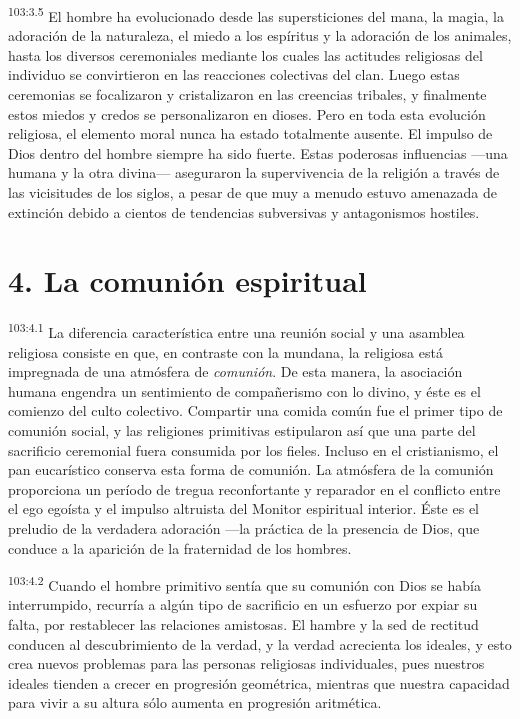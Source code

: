 \par
\textsuperscript{103:3.5} El hombre ha evolucionado desde las supersticiones del mana, la magia, la adoración de la naturaleza, el miedo a los espíritus y la adoración de los animales, hasta los diversos ceremoniales mediante los cuales las actitudes religiosas del individuo se convirtieron en las reacciones colectivas del clan. Luego estas ceremonias se focalizaron y cristalizaron en las creencias tribales, y finalmente estos miedos y credos se personalizaron en dioses. Pero en toda esta evolución religiosa, el elemento moral nunca ha estado totalmente ausente. El impulso de Dios dentro del hombre siempre ha sido fuerte. Estas poderosas influencias ---una humana y la otra divina--- aseguraron la supervivencia de la religión a través de las vicisitudes de los siglos, a pesar de que muy a menudo estuvo amenazada de extinción debido a cientos de tendencias subversivas y antagonismos hostiles.

\section*{4. La comunión espiritual}
\par
\textsuperscript{103:4.1} La diferencia característica entre una reunión social y una asamblea religiosa consiste en que, en contraste con la mundana, la religiosa está impregnada de una atmósfera de \textit{comunión}. De esta manera, la asociación humana engendra un sentimiento de compañerismo con lo divino, y éste es el comienzo del culto colectivo. Compartir una comida común fue el primer tipo de comunión social, y las religiones primitivas estipularon así que una parte del sacrificio ceremonial fuera consumida por los fieles. Incluso en el cristianismo, el pan eucarístico conserva esta forma de comunión. La atmósfera de la comunión proporciona un período de tregua reconfortante y reparador en el conflicto entre el ego egoísta y el impulso altruista del Monitor espiritual interior. Éste es el preludio de la verdadera adoración ---la práctica de la presencia de Dios, que conduce a la aparición de la fraternidad de los hombres.

\par
\textsuperscript{103:4.2} Cuando el hombre primitivo sentía que su comunión con Dios se había interrumpido, recurría a algún tipo de sacrificio en un esfuerzo por expiar su falta, por restablecer las relaciones amistosas. El hambre y la sed de rectitud conducen al descubrimiento de la verdad, y la verdad acrecienta los ideales, y esto crea nuevos problemas para las personas religiosas individuales, pues nuestros ideales tienden a crecer en progresión geométrica, mientras que nuestra capacidad para vivir a su altura sólo aumenta en progresión aritmética.

